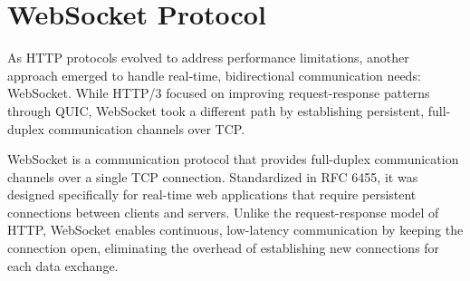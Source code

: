 \begin{table}[H]
\centering
{}
\caption{Evolution of HTTP protocol features across versions}
\end{table}


\section{WebSocket Protocol}

As HTTP protocols evolved to address performance limitations, another approach emerged to handle real-time, bidirectional communication needs: WebSocket. While HTTP/3 focused on improving request-response patterns through QUIC, WebSocket took a different path by establishing persistent, full-duplex communication channels over TCP.

WebSocket is a communication protocol that provides full-duplex communication channels over a single TCP connection. Standardized in RFC 6455, it was designed specifically for real-time web applications that require persistent connections between clients and servers. Unlike the request-response model of HTTP, WebSocket enables continuous, low-latency communication by keeping the connection open, eliminating the overhead of establishing new connections for each data exchange.


